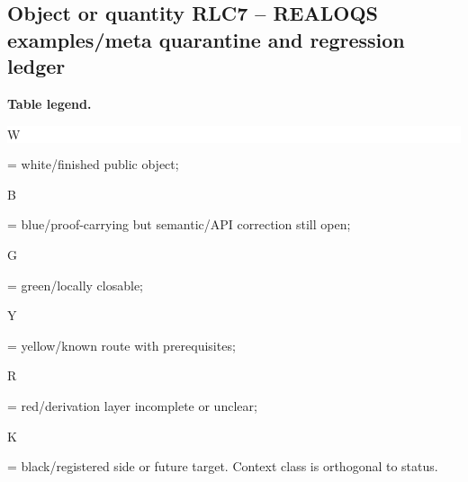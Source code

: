 \subsection*{Object or quantity RLC7 -- REALOQS examples/\allowbreak{}meta quarantine and regression ledger}
\hypertarget{objproof:RLC7}{}
\par\smallskip\noindent\begin{minipage}{0.99\linewidth}\footnotesize\raggedright\textbf{Table legend.} \colorbox{white}{\strut W} = white/finished public object; \colorbox{cyan!20}{\strut B} = blue/proof-carrying but semantic/API correction still open; \colorbox{green!18}{\strut G} = green/locally closable; \colorbox{yellow!25}{\strut Y} = yellow/known route with prerequisites; \colorbox{red!20}{\strut R} = red/derivation layer incomplete or unclear; \colorbox{black!18}{\strut K} = black/registered side or future target. Context class is orthogonal to status.\end{minipage}\par\vspace{0.25em}
